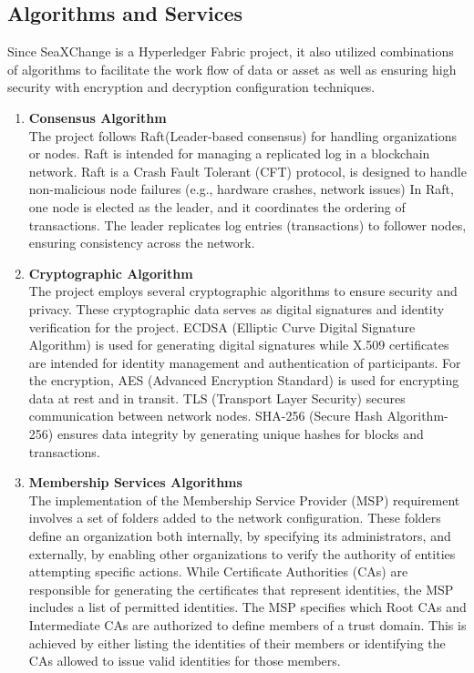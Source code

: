 \subsection{Algorithms and Services}
Since SeaXChange is a Hyperledger Fabric project, it also utilized combinations of algorithms to facilitate the work flow of data or asset as well as ensuring high security with encryption and decryption configuration techniques. 
	\begin{enumerate}
		\item \textbf{Consensus Algorithm} \\The project follows Raft(Leader-based consensus) for handling organizations or nodes. Raft is intended for managing a replicated log in a blockchain network. Raft is a Crash Fault Tolerant (CFT) protocol, is designed to handle non-malicious node failures (e.g., hardware crashes, network issues) In Raft, one node is elected as the leader, and it coordinates the ordering of transactions. The leader replicates log entries (transactions) to follower nodes, ensuring consistency across the network. 
		
		\item \textbf{Cryptographic Algorithm} \\The project employs several cryptographic algorithms to ensure security and privacy. These cryptographic data serves as digital signatures and identity verification for the project. ECDSA (Elliptic Curve Digital Signature Algorithm) is used for generating digital signatures while X.509 certificates are intended for identity management and authentication of participants. For the encryption, AES (Advanced Encryption Standard) is used for encrypting data at rest and in transit. TLS (Transport Layer Security) secures communication between network nodes. SHA-256 (Secure Hash Algorithm-256) ensures data integrity by generating unique hashes for blocks and transactions.
		
		\item \textbf{Membership Services Algorithms} \\The implementation of the Membership Service Provider (MSP) requirement involves a set of folders added to the network configuration. These folders define an organization both internally, by specifying its administrators, and externally, by enabling other organizations to verify the authority of entities attempting specific actions. While Certificate Authorities (CAs) are responsible for generating the certificates that represent identities, the MSP includes a list of permitted identities. The MSP specifies which Root CAs and Intermediate CAs are authorized to define members of a trust domain. This is achieved by either listing the identities of their members or identifying the CAs allowed to issue valid identities for those members.
		

\end{enumerate}
